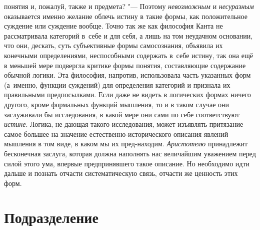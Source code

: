 понятия и, пожалуй, также и предмета? "--- Поэтому {\em невозможным} и
{\em несуразным} оказывается именно желание облечь истину в такие формы, как
положительное суждение или суждение вообще. Точно так же как философия
Канта не рассматривала категорий в~себе и для себя, а лишь на том неудачном
основании, что они, дескать, суть субъективные формы самосознания, объявила
их конечными определениями, неспособными содержать в~себе истину, так она
ещё в меньшей мере подвергла критике формы понятия, составляющие содержание
обычной логики. Эта философия, напротив, использовала часть указанных форм
(а~именно, функции суждений) для определения категорий и признала их
правильными предпосылками. Если даже не видеть в логических формах ничего
другого, кроме формальных функций мышления, то и в таком случае они
заслуживали бы исследования, в какой мере они сами по себе соответствуют
{\em истине}. Логика, не
дающая такого исследования, может изъявлять притязание самое большее на
значение естественно-исторического описания явлений мышления в том виде, в
каком мы их пред-находим. {\em Аристотелю}
принадлежит бесконечная заслуга, которая должна наполнять нас
величайшим уважением перед силой этого ума, впервые предпринявшего такое
описание. Но необходимо идти дальше и познать отчасти систематическую
связь,
отчасти же ценность этих форм.

\section[Подразделение]{Подразделение}

